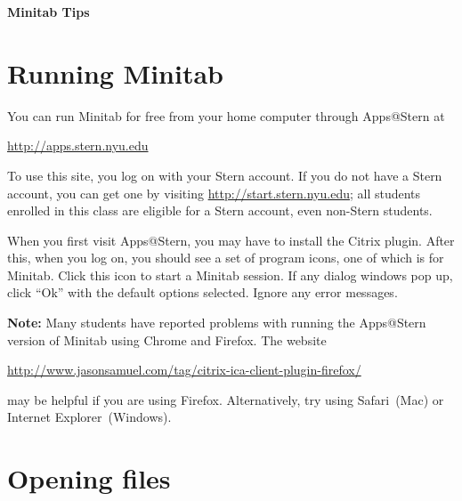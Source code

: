 \documentclass[11pt]{article}
\begin{document}
\begin{center}
  \large
  \textbf{Minitab Tips} %
\end{center}


\section*{Running Minitab}


You can run Minitab for free from your home computer through Apps@Stern at
\begin{center}
  \url{http://apps.stern.nyu.edu}
\end{center}
To use this site, you log on with your Stern
account. If you do not have a Stern account, you can get one by visiting
\url{http://start.stern.nyu.edu}; all students enrolled in this class are
eligible for a Stern account, even non-Stern students.


When you first visit Apps@Stern, you may have to install the Citrix plugin.
After this, when you log on, you should see a set of program icons, one of
which is for Minitab. Click this icon to start a Minitab session. If any
dialog windows pop up, click ``Ok'' with the default options selected. Ignore
any error messages.

\textbf{Note:} Many students have reported problems with running the
Apps@Stern version of Minitab using Chrome and Firefox.  The website
\begin{center}
\url{http://www.jasonsamuel.com/tag/citrix-ica-client-plugin-firefox/}
\end{center}
may be helpful if you are using Firefox.  Alternatively, try using
Safari~(Mac) or Internet Explorer~(Windows).



\section*{Opening files}
\end{document}
